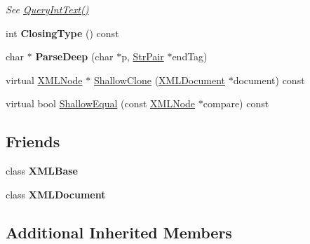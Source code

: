 \begin{DoxyCompactItemize}
\begin{DoxyCompactList}\small\item\em See \hyperlink{classtinyxml2_1_1_x_m_l_element_a71327c9a9d8840562bd204f46d0a7189}{Query\-Int\-Text()} \end{DoxyCompactList}\item 
\hypertarget{classtinyxml2_1_1_x_m_l_element_a2e3d9f938307a05963d7c4b8cd55754e}{int {\bfseries Closing\-Type} () const }\label{classtinyxml2_1_1_x_m_l_element_a2e3d9f938307a05963d7c4b8cd55754e}

\item 
\hypertarget{classtinyxml2_1_1_x_m_l_element_aaafdd2a5618abe80a2c1839ad3ccd492}{char $\ast$ {\bfseries Parse\-Deep} (char $\ast$p, \hyperlink{classtinyxml2_1_1_str_pair}{Str\-Pair} $\ast$end\-Tag)}\label{classtinyxml2_1_1_x_m_l_element_aaafdd2a5618abe80a2c1839ad3ccd492}

\item 
virtual \hyperlink{classtinyxml2_1_1_x_m_l_node}{X\-M\-L\-Node} $\ast$ \hyperlink{classtinyxml2_1_1_x_m_l_element_a85d85e32c18863fff1eeed53ae1ce23d}{Shallow\-Clone} (\hyperlink{classtinyxml2_1_1_x_m_l_document}{X\-M\-L\-Document} $\ast$document) const 
\item 
virtual bool \hyperlink{classtinyxml2_1_1_x_m_l_element_a25d51a2aad92625c78441457d58c85bc}{Shallow\-Equal} (const \hyperlink{classtinyxml2_1_1_x_m_l_node}{X\-M\-L\-Node} $\ast$compare) const 
\end{DoxyCompactItemize}
\subsection*{Friends}
\begin{DoxyCompactItemize}
\item 
\hypertarget{classtinyxml2_1_1_x_m_l_element_a449202cfc89e7ae5c2f81995476f9ec1}{class {\bfseries X\-M\-L\-Base}}\label{classtinyxml2_1_1_x_m_l_element_a449202cfc89e7ae5c2f81995476f9ec1}

\item 
\hypertarget{classtinyxml2_1_1_x_m_l_element_a4eee3bda60c60a30e4e8cd4ea91c4c6e}{class {\bfseries X\-M\-L\-Document}}\label{classtinyxml2_1_1_x_m_l_element_a4eee3bda60c60a30e4e8cd4ea91c4c6e}

\end{DoxyCompactItemize}
\subsection*{Additional Inherited Members}


